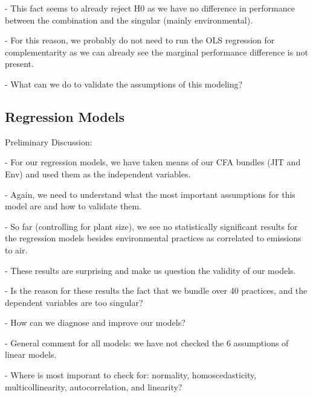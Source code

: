 - This fact seems to already reject H0 as we have no difference in performance between the combination and the singular (mainly environmental).

- For this reason, we probably do not need to run the OLS regression for complementarity as we can already see the marginal performance difference is not present.

- What can we do to validate the assumptions of this modeling?


\subsection*{Regression Models}
Preliminary Discussion:

- For our regression models, we have taken means of our CFA bundles (JIT and Env) and used them as the independent variables.

- Again, we need to understand what the most important assumptions for this model are and how to validate them.

- So far (controlling for plant size), we see no statistically significant results for the regression models besides environmental practices as correlated to emissions to air.

- These results are surprising and make us question the validity of our models.

- Is the reason for these results the fact that we bundle over 40 practices, and the dependent variables are too singular?

- How can we diagnose and improve our models?

- General comment for all models: we have not checked the 6 assumptions of linear models.

- Where is most imporant to check for: normality, homoscedasticity, multicollinearity, autocorrelation, and linearity?



